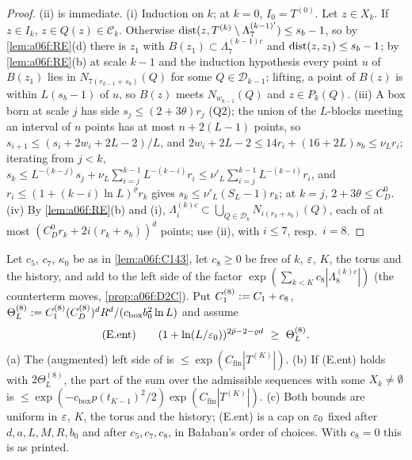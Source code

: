 \begin{proof}
(ii) is immediate. (i) Induction on $k$; at $k=0$, $I_0=T^{(0)}$. Let $z\in X_k$. If $z\in I_k$, $z\in Q(z)\in\mathcal C_k$. Otherwise $\operatorname{dist}(z,T^{(k)}\setminus\Lambda^{(k-1)'}_7)\le s_b-1$, so by \cref{lem:a06f:RE}(d) there is $z_1$ with $B(z_1)\subset\Lambda^{(k-1)c}_7$ and $\operatorname{dist}(z,z_1)\le s_b-1$; by \cref{lem:a06f:RE}(b) at scale $k-1$ and the induction hypothesis every point $u$ of $B(z_1)$ lies in $N_{7(r_{k-1}+s_b)}(Q)$ for some $Q\in\mathcal D_{k-1}$; lifting, a point of $B(z)$ is within $L(s_b-1)$ of $u$, so $B(z)$ meets $N_{w_{k-1}}(Q)$ and $z\in P_k(Q)$. (iii) A box born at scale $j$ has side $s_j\le(2+3\theta)r_j$ (Q2); the union of the $L$-blocks meeting an interval of $n$ points has at most $n+2(L-1)$ points, so $s_{i+1}\le(s_i+2w_i+2L-2)/L$, and $2w_i+2L-2\le14r_i+(16+2L)s_b\le\nu_Lr_i$; iterating from $j<k$, $s_k\le L^{-(k-j)}s_j+\nu_L\sum_{i=j}^{k-1}L^{-(k-i)}r_i\le\nu'_L\sum_{i=j}^{k-1}L^{-(k-i)}r_i$, and $r_i\le(1+(k-i)\ln L)^\varrho r_k$ gives $s_k\le\nu'_L(S_L-1)r_k$; at $k=j$, $2+3\theta\le C^0_D$. (iv) By \cref{lem:a06f:RE}(b) and (i), $\Lambda^{(k)c}_i\subset\bigcup_{Q\in\mathcal D_k}N_{i(r_k+s_b)}(Q)$, each of at most $(C^0_Dr_k+2i(r_k+s_b))^d$ points; use (ii), with $i\le7$, resp.\ $i=8$.
\end{proof}

\begin{theorem}[{\cite[(3.42)]{Ba2} at $L=5$}]\label{thm:a06f:R7}
Let $c_5$, $c_7$, $\kappa_0$ be as in \cref{lem:a06f:C143}, let $c_8\ge0$ be free of $k$, $\varepsilon$, $K$, the torus and the history, and add to the left side of \cite[(3.42)]{Ba2} the factor $\exp(\sum_{k<K}c_8|\Lambda^{(k)c}_8|)$ (the counterterm moves, \cref{prop:a06f:D2C}). Put $C_1^{(8)}:= C_1+c_8$, $\Theta^{(8)}_L:= C^{(8)}_1(C^{(8)}_D)^dR^d/(c_{\mathrm{box}}b_0^2\ln L)$ and assume
\[
(\mathrm{E.ent})\qquad(1+\ln(L/\varepsilon_0))^{2\bar p-2-\varrho d}\ \ge\ \Theta^{(8)}_L.
\]
\textup{(a)} The (augmented) left side of \cite[(3.42)]{Ba2} is $\le\exp(C_{\mathrm{fin}}|T^{(K)}|)$. \textup{(b)} If (E.ent) holds with $2\Theta^{(8)}_L$, the part of the sum over the admissible sequences with some $X_k\ne\emptyset$ is $\le\exp(-c_{\mathrm{box}}p(t_{K-1})^2/2)\exp(C_{\mathrm{fin}}|T^{(K)}|)$. \textup{(c)} Both bounds are uniform in $\varepsilon$, $K$, the torus and the history; (E.ent) is a cap on $\varepsilon_0$ fixed after $d,a,L,M,R,b_0$ and after $c_5,c_7,c_8$, in Ba{\l}aban's order of choices. With $c_8=0$ this is \cite[(3.42)]{Ba2} as printed.
\end{theorem}

